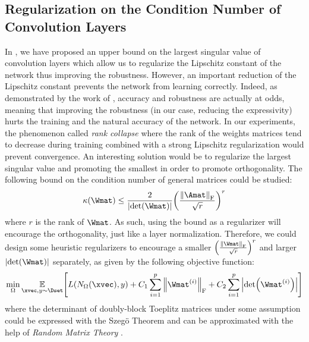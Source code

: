 \subsection{Regularization on the Condition Number of Convolution Layers}


In , we have proposed an upper bound on the largest singular value of convolution layers which allow us to regularize the Lipschitz constant of the network thus improving the robustness.
However, an important reduction of the Lipschitz constant prevents the network from learning correctly. 
Indeed, as demonstrated by the work of \cite{zhang2019theoretically}, accuracy and robustness are actually at odds, meaning that improving the robustness (\ie in our case, reducing the expressivity) hurts the training and the natural accuracy of the network. 
In our experiments, the phenomenon called \emph{rank collapse} \cite{saxe2014exact} where the rank of the weights matrices tend to decrease during training combined with a strong Lipschitz regularization would prevent convergence.
An interesting solution would be to regularize the largest singular value and promoting the smallest in order to promote orthogonality.
The following bound on the condition number of general matrices \citet{guggenheimer1995simple} could be studied:
\begin{equation}
  \kappa(\Wmat) \le \frac{2}{\abs{\det(\Wmat)}} \left(\frac{\norm{\Amat}_\fro}{\sqrt{r}}\right)^r
\end{equation}
where $r$ is the rank of $\Wmat$.
As such, using the bound as a regularizer will encourage the orthogonality, just like a layer normalization.
Therefore, we could design some heuristic regularizers to encourage a smaller $\left(\frac{\norm{\Wmat}_\fro}{\sqrt{r}}\right)^r$ and larger $\abs{\det(\Wmat)}$ separately, as given by the following objective function: 
\begin{align} 
  \min_{\Omega} \Ebb_{\xvec, y \sim \Dset} \left[ L(N_\Omega(\xvec), y)  + C_1 \sum_{i=1}^\depth \norm{\Wmat^{(i)}}_\fro + C_2 \sum_{i=1}^{\depth} \abs{\det(\Wmat^{(i)})} \right]
\end{align}
where the determinant of doubly-block Toeplitz matrices under some assumption could be expressed with the Szeg\"{o} Theorem \cite{szego1915grenzwertsatz} and can be approximated with the help of \emph{Random Matrix Theory} \cite{basor2017asymptotics}.

